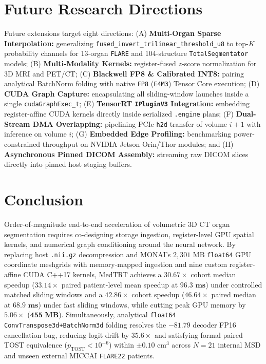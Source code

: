 \documentclass[10pt,twocolumn]{article}
\begin{document}
\section{Future Research Directions}
\label{sec:future}

Future extensions target eight directions: (A) \textbf{Multi-Organ Sparse Interpolation:} generalizing \texttt{fused\_invert\_trilinear\_threshold\_u8} to top-$K$ probability channels for 13-organ \texttt{FLARE} and 104-structure \texttt{TotalSegmentator} models; (B) \textbf{Multi-Modality Kernels:} register-fused $z$-score normalization for 3D MRI and PET/CT; (C) \textbf{Blackwell FP8 \& Calibrated INT8:} pairing analytical BatchNorm folding with native \texttt{FP8} (\texttt{E4M3}) Tensor Core execution; (D) \textbf{CUDA Graph Capture:} encapsulating all sliding-window launches inside a single \texttt{cudaGraphExec\_t}; (E) \textbf{TensorRT \texttt{IPluginV3} Integration:} embedding register-affine CUDA kernels directly inside serialized \texttt{.engine} plans; (F) \textbf{Dual-Stream DMA Overlapping:} pipelining PCIe \texttt{h2d} transfer of volume $i+1$ with inference on volume $i$; (G) \textbf{Embedded Edge Profiling:} benchmarking power-constrained throughput on NVIDIA Jetson Orin/Thor modules; and (H) \textbf{Asynchronous Pinned DICOM Assembly:} streaming raw DICOM slices directly into pinned host staging buffers.

\section{Conclusion}
\label{sec:conclusions}

Order-of-magnitude end-to-end acceleration of volumetric 3D CT organ segmentation requires co-designing storage ingestion, register-level GPU spatial kernels, and numerical graph conditioning around the neural network. By replacing host \texttt{.nii.gz} decompression and MONAI's $2,301\text{ MB}$ \texttt{float64} GPU coordinate meshgrids with memory-mapped ingestion and nine custom register-affine CUDA C++17 kernels, MedTRT achieves a $\mathbf{30.67\times}$ cohort median speedup ($\mathbf{33.14\times}$ paired patient-level mean speedup at $\mathbf{96.3\textbf{ ms}}$) under controlled matched sliding windows and a $\mathbf{42.86\times}$ cohort speedup ($\mathbf{46.64\times}$ paired median at $\mathbf{68.9\textbf{ ms}}$) under fast sliding windows, while cutting peak GPU memory by $\mathbf{5.06\times}$ ($\mathbf{455\textbf{ MB}}$). Simultaneously, analytical \texttt{float64} \texttt{ConvTranspose3d+BatchNorm3d} folding resolves the $-81.79$ decoder FP16 cancellation bug, reducing logit drift by $\mathbf{35.6\times}$ and satisfying formal paired TOST equivalence ($p_{\text{TOST}} < 10^{-6}$) within $\pm 0.10\text{ cm}^3$ across $N = 21$ internal MSD and unseen external MICCAI \texttt{FLARE22} patients.
\end{document}
